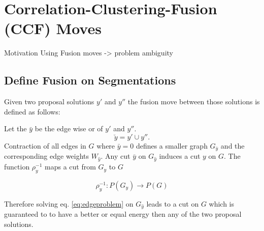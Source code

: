 \documentclass[10pt,twocolumn,letterpaper]{article}
\begin{document}
\section{Correlation-Clustering-Fusion (CCF) Moves}\label{sec:cc_fm}
Motivation Using Fusion moves -> problem ambiguity


%


\subsection{Define Fusion on Segmentations}

Given two proposal solutions $y'$ and $y''$
the fusion move between those solutions is defined
as follows:

Let the $\bar{y}$ be the edge wise or of  $y'$ and $y''$.
\begin{equation}
\breve{y} =  y' \cup y''.
\end{equation}
Contraction of all edges in $G$ where $\bar{y}=0$ defines
a smaller graph $G_{\bar{y}}$ and the corresponding
edge weights $W_{\hat{y}}$.
Any cut $\bar{y}$ on $G_{\hat{y}}$ induces a cut $y$ on $G$.
The function 
$\rho_y^{-1}$ maps a cut from $G_{\hat{y}}$  to $G$ 

\begin{equation}
   \rho_y^{-1} : P(G_y) \to P(G)
\end{equation}

Therefore solving eq. \ref{eq:edgeproblem} 
on $G_{\hat{y}}$
leads to a cut on $G$ which is guaranteed to 
to have a better or equal energy
then any of the two proposal solutions.






\end{document}
